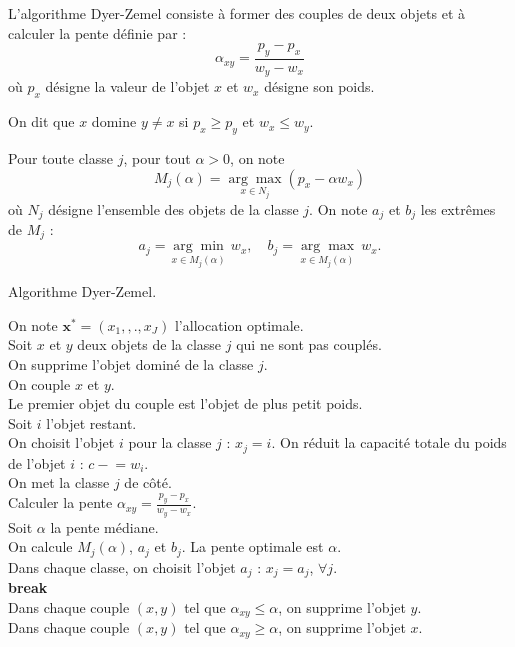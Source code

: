 \documentclass{article}
\newcommand{\minuseq}{\mathrel{-}=}
\begin{document}
L'algorithme Dyer-Zemel consiste à former des couples de deux objets et à calculer la pente définie par :
\[
	\alpha_{xy} = \frac{p_y - p_x}{w_y - w_x}
\]
où $p_x$ désigne la valeur de l'objet $x$ et $w_x$ désigne son poids.

On dit que $x$ domine $y\neq x$ si $p_x \geq p_y$ et $w_x \leq w_y$.

Pour toute classe $j$, pour tout $\alpha>0$, on note
\[ M_j(\alpha) = \underset{x\in N_j}{\arg \max} ( p_x - \alpha w_x) \]
où $N_j$ désigne l'ensemble des objets de la classe $j$.
On note $a_j$ et $b_j$ les extrêmes de $M_j$ :
\[ a_j = \underset{x\in M_j(\alpha)}{\arg\min}\ w_x, \quad b_j = \underset{x\in M_j(\alpha)}{\arg\max}\ w_x. \]

\begin{algorithm}[!ht]
\caption{Algorithme Dyer-Zemel.}
\label{alg:recherche-exhaustive}
\small
{}
{
	On note $\mathbf{x}^{*} = (x_1, ,., x_J)$ l'allocation optimale.\\
	{
		{
			Soit $x$ et $y$ deux objets de la classe $j$ qui ne sont pas couplés.\\
			{
				On supprime l'objet dominé de la classe $j$.\\
			}
			{
				On couple $x$ et $y$.\\
				Le premier objet du couple est l'objet de plus petit poids.\\
			}
		}
	}
	{
		{
			Soit $i$ l'objet restant.\\
			On choisit l'objet $i$ pour la classe $j$ : $x_j = i$.
			On réduit la capacité totale du poids de l'objet $i$ : $c \minuseq w_{i}$.\\
			On met la classe $j$ de côté.\\

		}
	}
	{
		Calculer la pente $\alpha_{xy} = \frac{p_{y}-p_{x}}{w_{y}-w_{x}}$.\\
	}
	Soit $\alpha$ la pente médiane.\\
	{
		On calcule $M_j(\alpha)$, $a_j$ et $b_j$.
	}
	{
		La pente optimale est $\alpha$.\\
		Dans chaque classe, on choisit l'objet $a_j$ : $x_j = a_j$, $\forall j$.\\
		\textbf{break}\\
	}
	{
		{
			Dans chaque couple $(x, y)$ tel que $\alpha_{xy} \leq \alpha$, on supprime l'objet $y$.\\
		}
		{
			Dans chaque couple $(x, y)$ tel que $\alpha_{xy} \geq \alpha$, on supprime l'objet $x$.\\
		}
	}
}
\end{algorithm}
\end{document}
